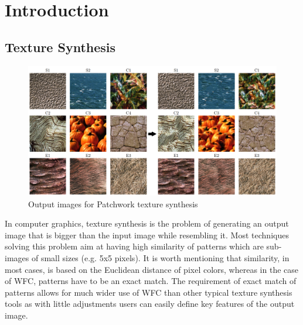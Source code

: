 \documentclass[shortabstract, english, inz]{iithesis}
\author         {Krzysztof Sławik}
\date          {03.02.2023}                     %
\begin{document}

\chapter{Introduction}
\section{Texture Synthesis}
\begin{figure}[H]
\centering
\includegraphics[width=1\textwidth, angle=0]{images/texsynth_input_output.png}
\caption{Output images for Patchwork texture synthesis \cite{harrison2002patchwork}}
\label{fig:texSynth}
\end{figure}
In computer graphics, texture synthesis is the problem of generating an output image that is bigger than the input image while resembling it. Most techniques solving this problem aim at having high similarity of patterns which are sub-images of small sizes (e.g. 5x5 pixels). It is worth mentioning that similarity, in most cases, is based on the Euclidean distance of pixel colors, whereas in the case of WFC, patterns have to be an exact match. \cite{Smith}
The requirement of exact match of patterns allows for much wider use of WFC than other typical texture synthesis tools as with little adjustments users can easily define key features of the output image. \cite{GraphBased}
\end{document}
